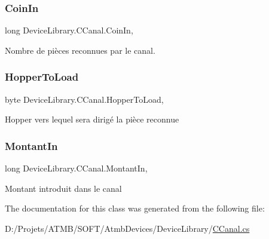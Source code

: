 \subsubsection{\texorpdfstring{Coin\+In}{CoinIn}}
{\footnotesize\ttfamily long Device\+Library.\+C\+Canal.\+Coin\+In\hspace{0.3cm}{\ttfamily [get]}, {\ttfamily [set]}}



Nombre de pièces reconnues par le canal. 

\mbox{\label{class_device_library_1_1_c_canal_a4b920e01736bd1a067401c6cc76e2e4e}} 
\subsubsection{\texorpdfstring{Hopper\+To\+Load}{HopperToLoad}}
{\footnotesize\ttfamily byte Device\+Library.\+C\+Canal.\+Hopper\+To\+Load\hspace{0.3cm}{\ttfamily [get]}, {\ttfamily [set]}}



Hopper vers lequel sera dirigé la pièce reconnue 

\mbox{\label{class_device_library_1_1_c_canal_ac80e273e29e18b3f2b598aaf9f04506f}} 
\subsubsection{\texorpdfstring{Montant\+In}{MontantIn}}
{\footnotesize\ttfamily long Device\+Library.\+C\+Canal.\+Montant\+In\hspace{0.3cm}{\ttfamily [get]}, {\ttfamily [set]}}



Montant introduit dans le canal 



The documentation for this class was generated from the following file\+:\begin{DoxyCompactItemize}
\item 
D\+:/\+Projets/\+A\+T\+M\+B/\+S\+O\+F\+T/\+Atmb\+Devices/\+Device\+Library/\mbox{\hyperlink{_c_canal_8cs}{C\+Canal.\+cs}}\end{DoxyCompactItemize}
